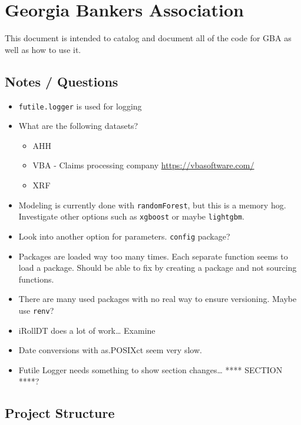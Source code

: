 \documentclass[
]{book}
\providecommand{\tightlist}{%
  \setlength{\itemsep}{0pt}\setlength{\parskip}{0pt}}
\begin{document}
\hypertarget{gba}{%
\chapter{Georgia Bankers Association}\label{gba}}

This document is intended to catalog and document all of the code for GBA as well as how to use it.

\hypertarget{notes-questions}{%
\section{Notes / Questions}\label{notes-questions}}

\begin{itemize}
\tightlist
\item
  \texttt{futile.logger} is used for logging
\item
  What are the following datasets?

  \begin{itemize}
  \tightlist
  \item
    AHH
  \item
    VBA - Claims processing company \url{https://vbasoftware.com/}
  \item
    XRF
  \end{itemize}
\item
  Modeling is currently done with \texttt{randomForest}, but this is a memory hog. Investigate other options such as \texttt{xgboost} or maybe \texttt{lightgbm}.
\item
  Look into another option for parameters. \texttt{config} package?
\item
  Packages are loaded way too many times. Each separate function seems to load a package. Should be able to fix by creating a package and not sourcing functions.
\item
  There are many used packages with no real way to ensure versioning. Maybe use \texttt{renv}?
\item
  iRollDT does a lot of work\ldots{} Examine
\item
  Date conversions with as.POSIXct seem very slow.
\item
  Futile Logger needs something to show section changes\ldots{} **** SECTION ****?
\end{itemize}

\hypertarget{project-structure}{%
\section{Project Structure}\label{project-structure}}
\end{document}
